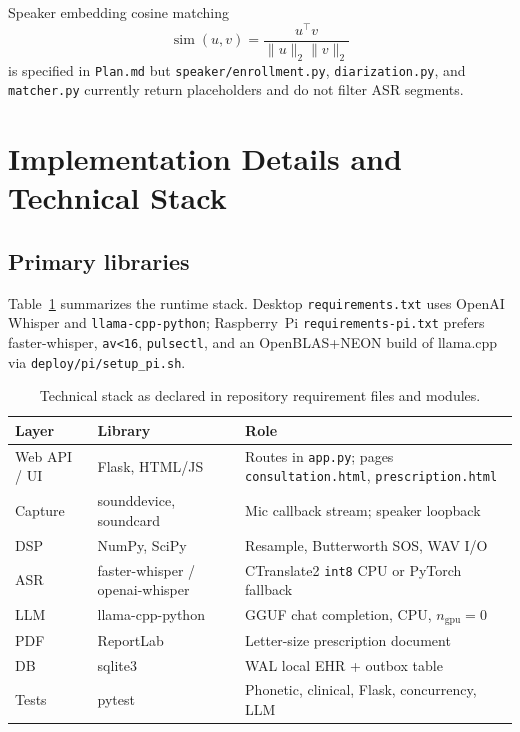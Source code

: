 \documentclass[11pt,a4paper]{article}
\begin{document}
Speaker embedding cosine matching
\begin{equation}
  \operatorname{sim}(u,v)=\frac{u^\top v}{\|u\|_2\|v\|_2}
\end{equation}
is specified in \texttt{Plan.md} but \texttt{speaker/enrollment.py}, \texttt{diarization.py}, and \texttt{matcher.py} currently return placeholders and do not filter ASR segments.

\section{Implementation Details and Technical Stack}

\subsection{Primary libraries}
Table~\ref{tab:stack} summarizes the runtime stack. Desktop \texttt{requirements.txt} uses OpenAI Whisper and \texttt{llama-cpp-python}; Raspberry~Pi \texttt{requirements-pi.txt} prefers faster-whisper, \texttt{av<16}, \texttt{pulsectl}, and an OpenBLAS+NEON build of llama.cpp via \texttt{deploy/pi/setup\_pi.sh}.

\begin{table}[htbp]
\centering
\caption{Technical stack as declared in repository requirement files and modules.}
\label{tab:stack}
\begin{tabular}{@{}llp{7.2cm}@{}}
\toprule
\textbf{Layer} & \textbf{Library} & \textbf{Role} \\
\midrule
Web API / UI & Flask, HTML/JS & Routes in \texttt{app.py}; pages \texttt{consultation.html}, \texttt{prescription.html} \\
Capture & sounddevice, soundcard & Mic callback stream; speaker loopback \\
DSP & NumPy, SciPy & Resample, Butterworth SOS, WAV I/O \\
ASR & faster-whisper / openai-whisper & CTranslate2 \texttt{int8} CPU or PyTorch fallback \\
LLM & llama-cpp-python & GGUF chat completion, CPU, $n_{\text{gpu}}=0$ \\
PDF & ReportLab & Letter-size prescription document \\
DB & sqlite3 & WAL local EHR + outbox table \\
Tests & pytest & Phonetic, clinical, Flask, concurrency, LLM \\
\bottomrule
\end{tabular}
\end{table}
\end{document}
